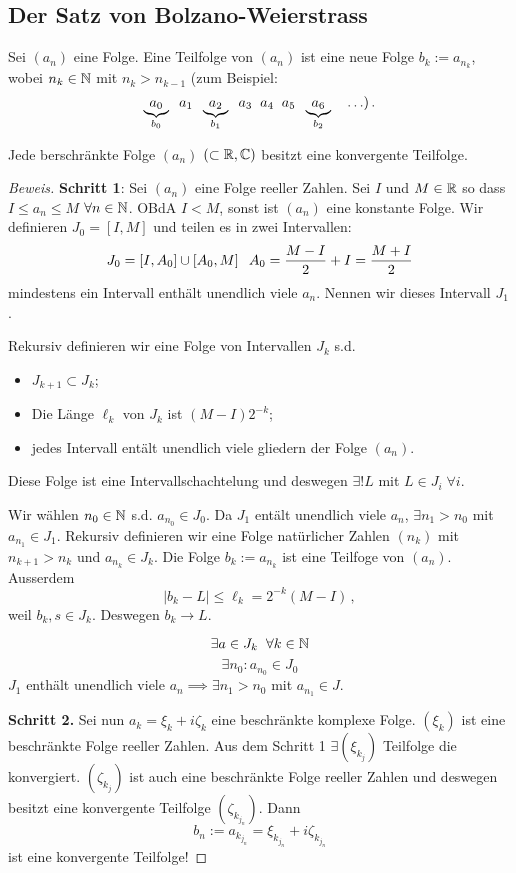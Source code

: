 \subsection{Der Satz von Bolzano-Weierstrass}
\begin{Def}
  Sei $(a_n)$ eine Folge. Eine Teilfolge von $(a_n)$ ist eine neue Folge 
$b_k:= a_{n_k}$, wobei $n_k\in\mathbb{N}$ mit $n_k>n_{k-1}$ (zum Beispiel:
\[\underbrace{a_0}_{b_0} \hspace{2mm} a_1\hspace{2mm}\underbrace{a_2}_{b_1}
\hspace{2mm} a_3\hspace{2mm} a_4 \hspace{2mm} a_5 \hspace{2mm}\underbrace{a_6}_{b_2} \quad \ldots )\, .\]
\end{Def}
\begin{Sat}
  Jede berschränkte Folge $(a_n)$ $(\subset\mathbb{R}, \mathbb{C})$ 
besitzt eine konvergente Teilfolge.
\end{Sat}
\begin{proof}[Beweis]
  {\bf Schritt 1}: Sei $(a_n)$ eine Folge reeller Zahlen. 
Sei $I$ und $M\in\mathbb{R}$ so dass $I\leq a_n\leq M$ 
$\forall n\in\mathbb{N}$. OBdA $I<M$, sonst ist $(a_n)$ eine konstante
Folge. Wir definieren $J_0 = [I, M]$ und teilen es in zwei Intervallen: 
 \[ J_0 = \left[ I,A_0 \right]\cup 
\left[ A_0, M \right]\hspace{2mm} A_0=\frac{M-I}{2}+I=\frac{M+I}{2}\]
  mindestens ein Intervall enthält unendlich viele $a_n$. 
Nennen wir dieses Intervall $J_1$.

Rekursiv definieren wir eine Folge von Intervallen $J_k$ s.d.
  \begin{itemize}
    \item $J_{k+1}\subset J_k$;
    \item Die Länge $\ell_k$ von $J_k$ ist $(M-I)2^{-k}$;
    \item jedes Intervall ent\"alt unendlich viele gliedern der Folge
$(a_n)$.
  \end{itemize}
Diese Folge ist eine Intervallschachtelung und deswegen $\exists ! L$
mit $L\in J_i \;\forall i$.

Wir w\"ahlen $n_0\in \mathbb{N}$ s.d. $a_{n_0}\in J_0$. Da $J_1$ ent\"alt 
unendlich viele $a_n$, $\exists n_1>n_0$ mit $a_{n_1}\in J_1$.
Rekursiv definieren wir eine Folge nat\"urlicher Zahlen $(n_k)$
mit $n_{k+1}>n_k$ und $a_{n_k}\in J_k$. Die Folge $b_k:= a_{n_k}$
ist eine Teilfoge von $(a_n)$. Ausserdem
\[
|b_k-L|\leq \ell_k = 2^{-k} (M-I)\, ,
\]
weil $b_k, s\in J_k$. Deswegen $b_k\to L$.

\[\exists a\in J_k\hspace{2mm}\forall k\in\mathbb{N}\]
  \[\exists n_0: a_{n_0}\in J_0\]
  $J_1$ enthält unendlich viele $a_n\implies \exists n_1>n_0$ mit $a_{n_1}\in J$. 

\medskip

{\bf Schritt 2.} Sei nun $a_k=\xi_k+i\zeta_k$ eine beschr\"ankte 
komplexe Folge. 
$(\xi_k)$ ist eine beschränkte Folge reeller Zahlen. 
Aus dem Schritt 1 $\exists (\xi_{k_j})$ Teilfolge die konvergiert.
$(\zeta_{k_j})$ ist auch eine beschränkte Folge reeller Zahlen 
und deswegen besitzt eine konvergente Teilfolge $(\zeta_{k_{j_n}})$.
Dann
\[b_n := a_{k_{j_n}}=\xi_{k_{j_n}}+i\zeta_{k_{j_n}}\]
ist eine konvergente Teilfolge!
\end{proof}
